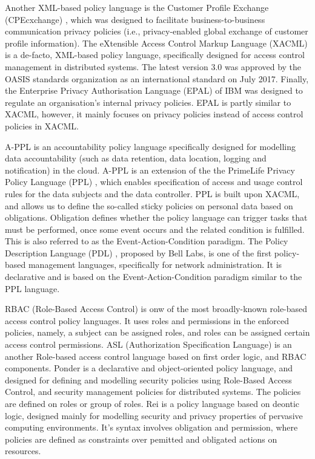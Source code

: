 \documentclass[a4paper]{article}
\begin{document}
Another XML-based policy language is the Customer Profile Exchange (CPEcxchange) \cite{CPexchange}, which was designed 
to facilitate business-to-business communication privacy policies (i.e., privacy-enabled global exchange of customer profile 
information). The eXtensible Access Control Markup Language (XACML) \cite{XACML} is a de-facto, XML-based
policy language, specifically designed for access control management in distributed systems. The latest version 3.0 was approved by the 
OASIS standards organization as an international standard on July 2017. Finally, the 
Enterprise Privacy Authorisation Language (EPAL) of IBM \cite{EPAL} was designed to regulate an organisation's 
internal privacy policies. EPAL is partly similar to XACML, however, it mainly focuses on privacy policies instead of 
access control policies in XACML.  


A-PPL \cite{APPL} is an accountability policy language specifically designed for modelling data accountability (such as data 
retention, data location, logging and notification) in the cloud. A-PPL is an extension of the the PrimeLife Privacy Policy 
Language (PPL) \cite{PPL}, which enables specification of access and usage control rules for the data subjects and the data 
controller. PPL is built upon XACML, and allows us to define the so-called sticky policies on personal data based on obligations. 
Obligation defines whether the policy language can trigger tasks that must be performed, once some event occurs and the related 
condition is fulfilled. This is also referred to as the Event-Action-Condition paradigm. The Policy Description Language (PDL) \cite{PDL}, 
proposed by Bell Labs, is one of the first policy-based management languages, specifically for network administration. It is declarative and 
is based on the Event-Action-Condition paradigm similar to the PPL language. 

RBAC (Role-Based Access Control) \cite{RBAC} is onw of the most broadly-known role-based access control policy languages.
It uses roles and permissions in the enforced policies, namely, a subject can be assigned roles, and roles can be assigned certain access control permissions. 
ASL (Authorization Specification Language) \cite{ASL} is an another Role-based access control language based on first order logic, and RBAC components. 
Ponder \cite{Ponder} is a declarative and object-oriented policy language, and designed for defining and modelling security policies
using Role-Based Access Control, and security management policies for distributed systems. The policies are defined on roles or group 
of roles. Rei \cite{Rei} is a policy language based on deontic logic, designed mainly for modelling security and privacy properties of 
pervasive computing environments. It's syntax involves obligation and permission, where policies are defined as constraints over pemitted and obligated actions on resources.
  
\end{document}
